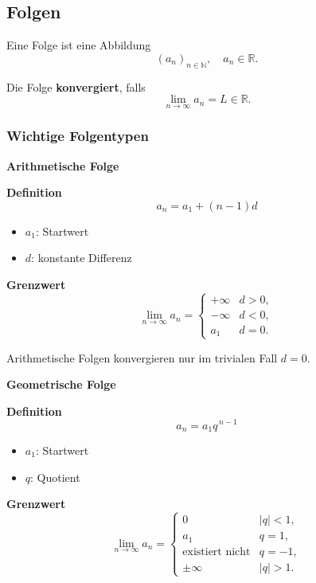    
    \subsection{Folgen}
    
    Eine Folge ist eine Abbildung
    \[
    (a_n)_{n\in\mathbb{N}}, \quad a_n \in \mathbb{R}.
    \]
    
    Die Folge \textbf{konvergiert}, falls
    \[
    \lim_{n\to\infty} a_n = L \in \mathbb{R}.
    \]
    
    \subsubsection{Wichtige Folgentypen}
    
    \textbf{Arithmetische Folge}
    
    \textbf{Definition}
    \[
    a_n = a_1 + (n-1)d
    \]
    
    \begin{itemize}
        \item $a_1$: Startwert
        \item $d$: konstante Differenz
    \end{itemize}
    
    \textbf{Grenzwert}
    \[
    \lim_{n\to\infty} a_n =
    \begin{cases}
        +\infty & d>0, \\
        -\infty & d<0, \\
        a_1 & d=0.
    \end{cases}
    \]
    
    Arithmetische Folgen konvergieren nur im trivialen Fall $d=0$.
    
    \textbf{Geometrische Folge}
    
    \textbf{Definition}
    \[
    a_n = a_1 q^{\,n-1}
    \]
    
    \begin{itemize}
        \item $a_1$: Startwert
        \item $q$: Quotient
    \end{itemize}
    
    \textbf{Grenzwert}
    \[
    \lim_{n\to\infty} a_n =
    \begin{cases}
        0 & |q|<1, \\
        a_1 & q=1, \\
        \text{existiert nicht} & q=-1, \\
        \pm\infty & |q|>1.
    \end{cases}
    \]
    

